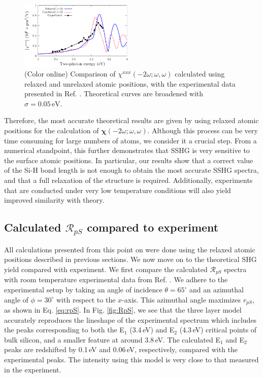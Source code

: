 \documentclass[prb,superscriptaddress,showpacs,twocolumn,letterpaper]{revtex4}
\begin{document}
\begin{figure}[t]
\centering
\includegraphics[width=0.48\textwidth]{fig2}
\caption{(Color online) Comparison of $\chi^{xxx}(-2\omega;\omega,\omega)$
calculated using relaxed and unrelaxed atomic positions, with the experimental
data presented in Ref. . Theoretical curves are broadened
with $\sigma=0.05\,\text{eV}$.\label{fig:Xxxx}}
\end{figure}

Therefore, the most accurate theoretical results are given by using relaxed
atomic positions for the calculation of
$\boldsymbol{\chi}(-2\omega;\omega,\omega)$. Although this process can be very
time consuming for large numbers of atoms, we consider it a crucial step. From a
numerical standpoint, this further demonstrates that SSHG is very sensitive to
the surface atomic positions. In particular, our results show that a correct
value of the Si-H bond length is not enough to obtain the most accurate SSHG
spectra, and that a full relaxation of the structure is required. Additionally,
experiments that are conducted under very low temperature conditions will also
yield improved similarity with theory.


\subsection{Calculated \texorpdfstring{$\mathcal{R}_{pS}$}{RpS} compared to
experiment}\label{sec:RpS}

All calculations presented from this point on were done using the relaxed atomic
positions described in previous sections. We now move on to the theoretical SHG
yield compared with experiment. We first compare the calculated
$\mathcal{R}_{pS}$ spectra with room temperature experimental data from Ref.
. We adhere to the experimental setup by taking an angle
of incidence $\theta=65^{\circ}$ and an azimuthal angle of $\phi=30^\circ$ with
respect to the $x$-axis. This azimuthal angle maximizes $r_{pS}$, as shown in
Eq. \eqref{eq:rpS}. In Fig. \ref{fig:RpS}, we see that the three layer model
accurately reproduces the lineshape of the experimental spectrum which includes
the peaks corresponding to both the E$_{1}$ (3.4\,eV) and E$_{2}$ (4.3\,eV)
critical points of bulk silicon, and a smaller feature at around 3.8\,eV. The
calculated E$_{1}$ and E$_{2}$ peaks are redshifted by 0.1\,eV and 0.06\,eV,
respectively, compared with the experimental peaks. The intensity using this
model is very close to that measured in the experiment. 
\end{document}
